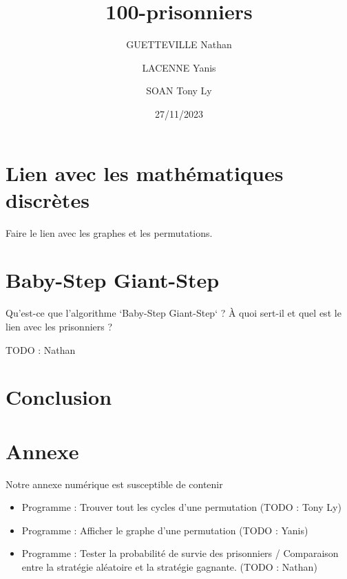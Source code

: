 \documentclass[a4paper]{article}
\title{100-prisonniers}
\date{27/11/2023}
\author{GUETTEVILLE Nathan}
\author{LACENNE Yanis}
\author{SOAN Tony Ly}
\affil{G4S12}
\begin{document}
\maketitle


\tableofcontents

\newpage



\section{Lien avec les mathématiques discrètes}
Faire le lien avec les graphes et les permutations.



\section{Baby-Step Giant-Step}
Qu'est-ce que l'algorithme `Baby-Step Giant-Step` ? À quoi sert-il et quel est le lien avec les prisonniers ?

TODO : Nathan

\section{Conclusion}

\section{Annexe}
Notre annexe numérique est susceptible de contenir
\begin{itemize}
	\item Programme : Trouver tout les cycles d'une permutation
	      (TODO : Tony Ly)
	\item Programme : Afficher le graphe d'une permutation
	      (TODO : Yanis)
	\item Programme : Tester la probabilité de survie des prisonniers / Comparaison entre la stratégie aléatoire et la stratégie gagnante.
	      (TODO : Nathan)
\end{itemize}


\end{document}
